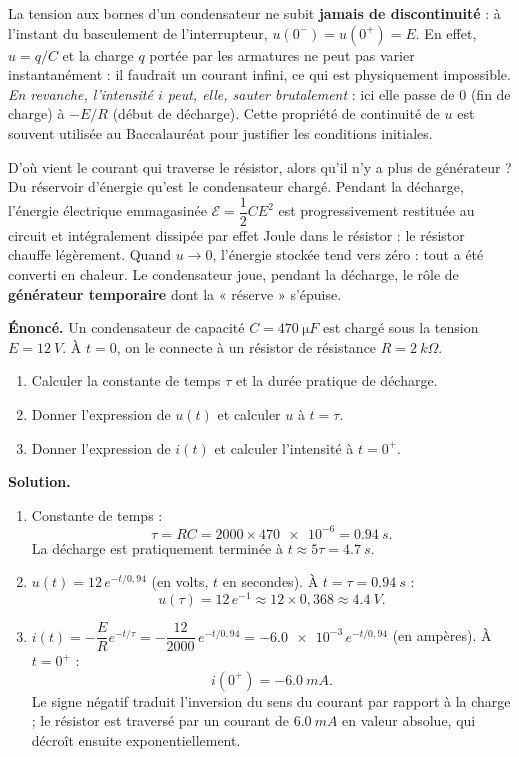 \documentclass[11pt]{article}
\newcommand{\cle}[1]{{\popxbold\color{popdark}#1}}
\newcounter{popsec}
\newcounter{popsub}
\newcommand{\courssub}[1]{%
  \stepcounter{popsub}%
  \par\vspace{9pt}\noindent{\popxbold\fontsize{11.5}{13}\selectfont\color{popink}{\color{poporange}\thepopsec.\thepopsub}\hspace{6pt}#1}\par\nopagebreak\vspace{4pt}
}
\begin{document}
\begin{propriete}
La tension aux bornes d'un condensateur ne subit \textbf{jamais de discontinuité} : à l'instant du basculement de l'interrupteur, $u(0^-) = u(0^+) = E$. En effet, $u = q/C$ et la charge $q$ portée par les armatures ne peut pas varier instantanément : il faudrait un courant infini, ce qui est physiquement impossible. \emph{En revanche, l'intensité $i$ peut, elle, sauter brutalement} : ici elle passe de $0$ (fin de charge) à $-E/R$ (début de décharge). Cette propriété de continuité de $u$ est souvent utilisée au Baccalauréat pour justifier les conditions initiales.
\end{propriete}

\courssub{Interprétation énergétique}

D'où vient le courant qui traverse le résistor, alors qu'il n'y a plus de générateur ? Du \cle{réservoir d'énergie} qu'est le condensateur chargé. Pendant la décharge, l'énergie électrique emmagasinée $\mathcal{E} = \dfrac{1}{2}CE^{2}$ est progressivement restituée au circuit et intégralement dissipée par \cle{effet Joule} dans le résistor : le résistor chauffe légèrement. Quand $u \to 0$, l'énergie stockée tend vers zéro : tout a été converti en chaleur. Le condensateur joue, pendant la décharge, le rôle de \textbf{générateur temporaire} dont la « réserve » s'épuise.

\begin{exoresolu}
\textbf{Énoncé.} Un condensateur de capacité $C = \SI{470}{\micro F}$ est chargé sous la tension $E = \SI{12}{V}$. À $t = 0$, on le connecte à un résistor de résistance $R = \SI{2}{k\Omega}$.
\begin{enumerate}
\item Calculer la constante de temps $\tau$ et la durée pratique de décharge.
\item Donner l'expression de $u(t)$ et calculer $u$ à $t = \tau$.
\item Donner l'expression de $i(t)$ et calculer l'intensité à $t = 0^+$.
\end{enumerate}
\tcblower
\textbf{Solution.}
\begin{enumerate}
\item Constante de temps :
\[ \tau = RC = \num{2000} \times \num{470e-6} = \SI{0,94}{s}. \]
La décharge est pratiquement terminée à $t \approx 5\tau = \SI{4,7}{s}$.
\item $u(t) = 12\,e^{-t/0{,}94}$ (en volts, $t$ en secondes). À $t = \tau = \SI{0,94}{s}$ :
\[ u(\tau) = 12\,e^{-1} \approx 12 \times 0{,}368 \approx \SI{4,4}{V}. \]
\item $i(t) = -\dfrac{E}{R}e^{-t/\tau} = -\dfrac{12}{2000}\,e^{-t/0{,}94} = -\num{6,0e-3}\,e^{-t/0{,}94}$ (en ampères). À $t = 0^+$ :
\[ i(0^+) = -\SI{6,0}{mA}. \]
Le signe négatif traduit l'inversion du sens du courant par rapport à la charge ; le résistor est traversé par un courant de $\SI{6,0}{mA}$ en valeur absolue, qui décroît ensuite exponentiellement.
\end{enumerate}
\end{exoresolu}
\end{document}
